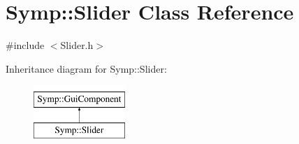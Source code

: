 \hypertarget{class_symp_1_1_slider}{\section{Symp\-:\-:Slider Class Reference}
\label{class_symp_1_1_slider}
}


{\ttfamily \#include $<$Slider.\-h$>$}

Inheritance diagram for Symp\-:\-:Slider\-:\begin{figure}[H]
\begin{center}
\leavevmode
\includegraphics[height=2.000000cm]{class_symp_1_1_slider}
\end{center}
\end{figure}
